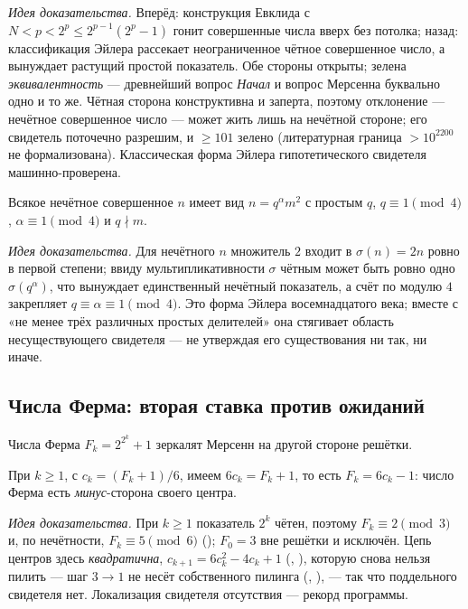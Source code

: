 \emph{Идея доказательства.} Вперёд: конструкция Евклида с $N<p<2^p\le 2^{p-1}(2^p-1)$ гонит
совершенные числа вверх без потолка; назад: классификация Эйлера рассекает неограниченное чётное
совершенное число, а  вынуждает растущий простой показатель.
Обе стороны открыты; зелена \emph{эквивалентность} --- древнейший вопрос \emph{Начал} и вопрос
Мерсенна буквально одно и то же. Чётная сторона конструктивна и заперта, поэтому отклонение ---
нечётное совершенное число --- может жить лишь на нечётной стороне; его свидетель поточечно разрешим,
и $\ge101$ зелено (литературная граница $>10^{2200}$ не формализована). Классическая форма Эйлера
гипотетического свидетеля машинно-проверена.

\begin{theorem}\label{thm:odd_perfect_euler_form}
\green{}\; Всякое нечётное совершенное $n$ имеет вид $n=q^{\alpha}m^2$ с простым $q$,
$q\equiv1\pmod4$, $\alpha\equiv1\pmod4$ и $q\nmid m$.
\end{theorem}

\emph{Идея доказательства.} Для нечётного $n$ множитель $2$ входит в $\sigma(n)=2n$ ровно в первой
степени; ввиду мультипликативности $\sigma$ чётным может быть ровно одно $\sigma(q^\alpha)$, что
вынуждает единственный нечётный показатель, а счёт по модулю $4$ закрепляет $q\equiv\alpha\equiv1
\pmod4$. Это форма Эйлера восемнадцатого века; вместе с «не менее трёх различных простых делителей»
она стягивает область несуществующего свидетеля --- не утверждая его существования ни так, ни иначе.

\subsection{Числа Ферма: вторая ставка против ожиданий}

Числа Ферма $F_k=2^{2^k}+1$ зеркалят Мерсенн на другой стороне решётки.

\begin{theorem}\label{thm:six_mul_fermatCenter}
\green{}\; При $k\ge1$, с $c_k=(F_k+1)/6$, имеем $6c_k=F_k+1$, то есть $F_k=6c_k-1$: число Ферма
есть \emph{минус}-сторона своего центра.
\end{theorem}

\emph{Идея доказательства.} При $k\ge1$ показатель $2^k$ чётен, поэтому $F_k\equiv2\pmod3$ и, по
нечётности, $F_k\equiv5\pmod6$ (); $F_0=3$ вне решётки и исключён. Цепь
центров здесь \emph{квадратична}, $c_{k+1}=6c_k^2-4c_k+1$ (, \green{}),
которую снова нельзя пилить --- шаг $3\to1$ не несёт собственного пилинга
(, \green{}), --- так что поддельного свидетеля нет.
Локализация свидетеля отсутствия --- рекорд программы.

